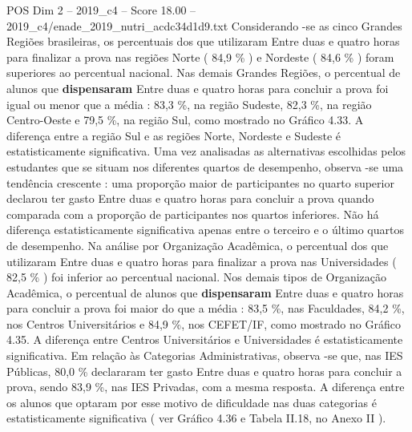 \begin{textsample}{POS Dim 2 – 2019\_c4 – Score 18.00 – 2019\_c4/enade\_2019\_nutri\_acdc34d1d9.txt}
Considerando -se as cinco Grandes Regiões brasileiras, os percentuais dos que utilizaram Entre duas e quatro horas para finalizar a prova nas regiões Norte ( 84,9 \% ) e Nordeste ( 84,6 \% ) foram superiores ao percentual nacional.
Nas demais Grandes Regiões, o percentual de alunos que \textbf{dispensaram} Entre duas e quatro horas para concluir a prova foi igual ou menor que a média : 83,3 \%, na região Sudeste, 82,3 \%, na região Centro-Oeste e 79,5 \%, na região Sul, como mostrado no Gráfico 4.33.
A diferença entre a região Sul e as regiões Norte, Nordeste e Sudeste é estatisticamente significativa.
Uma vez analisadas as alternativas escolhidas pelos estudantes que se situam nos diferentes quartos de desempenho, observa -se uma tendência crescente : uma proporção maior de participantes no quarto superior declarou ter gasto Entre duas e quatro horas para concluir a prova quando comparada com a proporção de participantes nos quartos inferiores.
Não há diferença estatisticamente significativa apenas entre o terceiro e o último quartos de desempenho.
Na análise por Organização Acadêmica, o percentual dos que utilizaram Entre duas e quatro horas para finalizar a prova nas Universidades ( 82,5 \% ) foi inferior ao percentual nacional.
Nos demais tipos de Organização Acadêmica, o percentual de alunos que \textbf{dispensaram} Entre duas e quatro horas para concluir a prova foi maior do que a média : 83,5 \%, nas Faculdades, 84,2 \%, nos Centros Universitários e 84,9 \%, nos CEFET/IF, como mostrado no Gráfico 4.35.
A diferença entre Centros Universitários e Universidades é estatisticamente significativa.
Em relação às Categorias Administrativas, observa -se que, nas IES Públicas, 80,0 \% declararam ter gasto Entre duas e quatro horas para concluir a prova, sendo 83,9 \%, nas IES Privadas, com a mesma resposta.
A diferença entre os alunos que optaram por esse motivo de dificuldade nas duas categorias é estatisticamente significativa ( ver Gráfico 4.36 e Tabela II.18, no Anexo II ).

\end{textsample}
